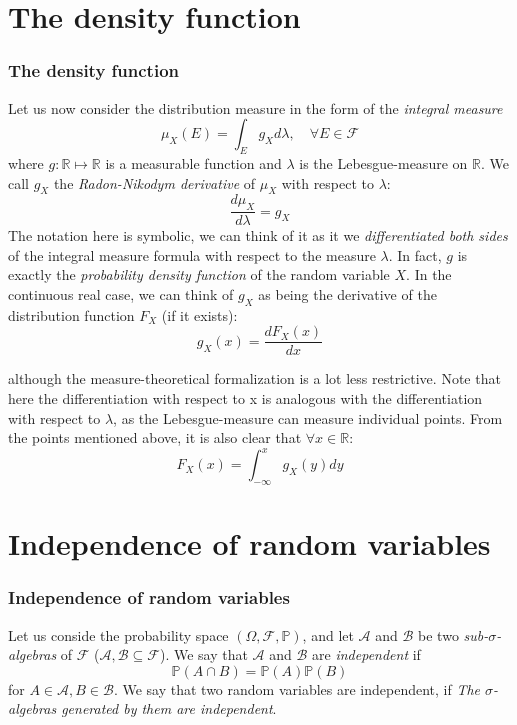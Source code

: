 \documentclass[xcolor=dvipsnames]{beamer}
\begin{document}
\section{The density function}
\begin{frame}
\frametitle{The density function}
Let us now consider the distribution measure in the form of the \emph{integral measure}
\[
	\mu_X(E) = \int_{E}{g_Xd\lambda}, \quad \forall E \in \mathcal{F}
\]
where $g : \mathbb{R} \mapsto \mathbb{R}$ is a measurable function and $\lambda$ is the Lebesgue-measure on $\mathbb{R}$. We call $g_X$ the \emph{Radon-Nikodym derivative} of $\mu_X$ with respect to $\lambda$:
\[
	\frac{d\mu_X}{d\lambda} = g_X
\]
The notation here is symbolic, we can think of it as it we \emph{differentiated both sides} of the integral measure formula with respect to the measure $\lambda$.
In fact, $g$ is exactly the \emph{probability density function} of the random variable $X$. In the continuous real case, we can think of $g_X$ as being the derivative of the distribution function $F_X$ (if it exists):
\[
	g_X(x) = \frac{dF_X(x)}{dx}
\]
\end{frame}
\begin{frame}
although the measure-theoretical formalization is a lot less restrictive. Note that here the differentiation with respect to x is analogous with the differentiation with respect to $\lambda$, as the Lebesgue-measure can measure individual points. From the points mentioned above, it is also clear that $\forall x \in \mathbb{R}$:
\[
	F_X(x) = \int_{-\infty}^{x}{g_X(y)dy}
\]
\end{frame}

\section{Independence of random variables}
\begin{frame}
\frametitle{Independence of random variables}
Let us conside the probability space $(\Omega, \mathcal{F}, \mathbb{P})$, and let $\mathcal{A}$ and $\mathcal{B}$ be two \emph{sub-$\sigma$-algebras} of $\mathcal{F}$ ($\mathcal{A}, \mathcal{B} \subseteq \mathcal{F}$). We say that $\mathcal{A}$ and $\mathcal{B}$ are \emph{independent} if
\[
	\mathbb{P}(A \cap B) = \mathbb{P}(A)\mathbb{P}(B)
\]
for  $A \in \mathcal{A}, B \in \mathcal{B}$.
We say that two random variables are independent, if \emph{The $\sigma$-algebras generated by them are independent}.
\end{frame}
\end{document}
